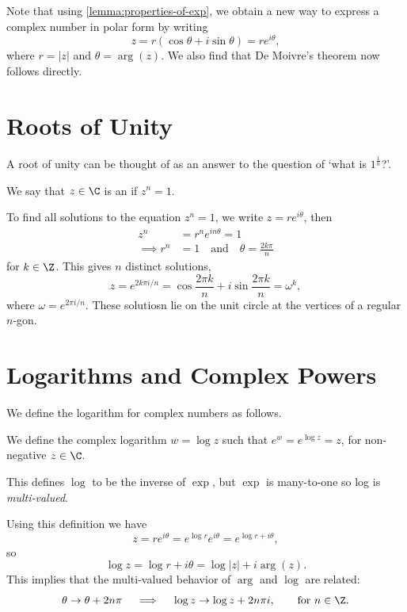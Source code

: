 \documentclass[a4]{scrreprt}
\begin{document}
Note that using \autoref{lemma:properties-of-exp}, we obtain a new way to express a complex number in polar form by writing
$$
z = r(\cos \theta + i \sin \theta) = re^{i \theta},
$$
where $r = |z|$ and $\theta = \arg(z)$. We also find that De Moivre's theorem now follows directly. 

\section{Roots of Unity}

A root of unity can be thought of as an answer to the question of `what is $1^{\frac{1}{n}}$?'.

\begin{definition}
	We say that $z \in \C$ is an  if $z^n = 1$.
\end{definition}

To find all solutions to the equation $z^n = 1$, we write $z = re^{i \theta}$, then
\begin{align*}
	z^n &= r^n e^{i n \theta} = 1 \\
	\implies r^n &= 1 \quad \text{and} \quad  \theta = \frac{2 k \pi}{n}
\end{align*}
for $k \in \Z$. This gives $n$ distinct solutions,
$$
z = e^{2 k\pi i/n} = \cos \frac{2\pi k}{n} + i \sin \frac{2 \pi k}{n} = \omega^k,
$$
where $\omega = e^{2 \pi i/n}$. These solutiosn lie on the unit circle at the vertices of a regular $n$-gon.

\section{Logarithms and Complex Powers}

We define the logarithm for complex numbers as follows.

\begin{definition}
	We define the complex logarithm $w = \log z$ such that $e^w = e^{\log z} = z$, for non-negative $z \in \C$.
\end{definition}

This defines $\log$ to be the inverse of $\exp$, but $\exp$ is many-to-one so log is \emph{multi-valued}.

Using this definition we have
$$
z = re^{i \theta} = e^{\log r} e^{i \theta} = e^{\log r + i \theta},
$$
so 
$$
\log z= \log r + i \theta = \log |z| + i \arg(z).
$$
This implies that the multi-valued behavior of $\arg$ and $\log$ are related:
$$
\theta \rightarrow \theta + 2n \pi  \quad \implies \quad \log z \rightarrow \log z + 2 n \pi i, \quad \quad \text{for } n \in \Z.
$$
\end{document}
